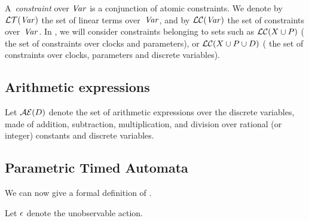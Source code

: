 A~\emph{constraint} over $\mathit{Var}$ is a conjunction of atomic constraints.
We denote by $\mathcal{LT}(\mathit{Var})$ the set of linear terms over~$\mathit{Var}$, and by $\mathcal{LC}(\mathit{Var})$ the set of constraints over~$\mathit{Var}$.
In \imitator{}, we will consider constraints belonging to sets such as $\mathcal{LC}(X \cup P)$ (\ie{} the set of constraints over clocks and parameters), or $\mathcal{LC}(X \cup P \cup D)$ (\ie{} the set of constraints over clocks, parameters and discrete variables).



\subsection{Arithmetic expressions}

Let $\mathcal{AE}(D)$ denote the set of arithmetic expressions over the discrete variables, \ie{} made of addition, subtraction, multiplication, and division over rational (or integer) constants and discrete variables.



\subsection{\imitator{} Parametric Timed Automata}


We can now give a formal definition of \IPTA{}.

Let $\epsilon$ denote the unobservable action.

